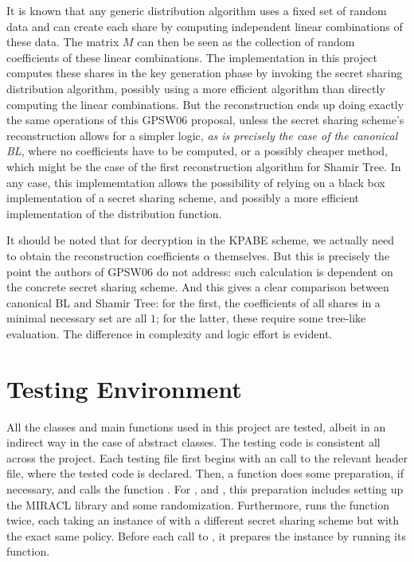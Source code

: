 \documentclass{article}
\begin{document}
It is known that any generic distribution algorithm uses a fixed set of random data and can create each share by computing independent linear combinations of these data. The matrix $M$ can then be seen as the collection of random coefficients of these linear combinations. The implementation in this project computes these shares in the key generation phase by invoking the secret sharing distribution algorithm, possibly using a more efficient algorithm than directly computing the linear combinations. But the reconstruction ends up doing exactly the same operations of this GPSW06 proposal, unless the secret sharing scheme's reconstruction allows for a simpler logic, \emph{as is precisely the case of the canonical BL}, where no coefficients have to be computed, or a possibly cheaper method, which might be the case of the first reconstruction algorithm for Shamir Tree. 
In any case, this implememtation allows the possibility of relying on a black box implementation of a secret sharing scheme, and possibly a more efficient implementation of the distribution function.

It should be noted that for decryption in the KPABE scheme, we actually need to obtain the reconstruction coefficients $\alpha$ themselves. But this is precisely the point the authors of GPSW06 do not address: such calculation is dependent on the concrete secret sharing scheme. And this gives a clear comparison between canonical BL and Shamir Tree: for the first, the coefficients of all shares in a minimal necessary set are all $1$; for the latter, these require some tree-like evaluation. The difference in complexity and logic effort is evident.


\section{Testing Environment}

All the classes and main functions used in this project are tested, albeit in an indirect way in the case of abstract classes. The testing code is consistent all across the project. Each testing file first begins with an  call to the relevant header file, where the tested code is declared. Then, a  function does some preparation, if necessary, and calls the function . For \ftkpabe, \ftblcanon and \ftshtree, this preparation includes setting up the MIRACL library and some randomization. Furthermore, \fckpabe runs the function  twice, each taking an instance of \cKPABE with a different secret sharing scheme but with the exact same policy. Before each call to , it prepares the \cKPABE instance by running its  function.
\end{document}
